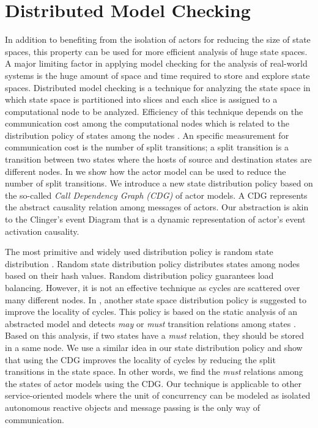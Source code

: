 \section{Distributed Model Checking} \label{sec::DMC}
In addition to benefiting from the isolation of actors for reducing the size of state spaces, this property can be used for more efficient analysis of huge state spaces. A major limiting factor in applying model checking for the analysis of real-world systems is the huge amount of space and time required to store and explore state spaces. Distributed model checking is a technique for analyzing the state space in which state space is partitioned into slices and each slice is assigned to a computational node to be analyzed. Efficiency of this technique depends on the communication cost among the computational nodes which is related to the distribution policy of states among the nodes \cite{DBLP:journals/entcs/OrzanPE05}.
%
An specific measurement for communication cost is the number of split transitions; a split transition is a transition between two states  where the hosts of source and destination states are different nodes. In \cite{DBLP:journals/eceasst/KhamespanahSMSR15} we show how the actor model can be used to reduce the number of split transitions. We introduce a new state distribution policy based on the so-called \textit{Call Dependency Graph (CDG)} of actor models. A CDG represents the abstract causality relation among messages of actors. Our abstraction is akin to the Clinger's event Diagram \cite{clinger} that is a dynamic representation of actor's event activation causality. 

The most primitive and widely used distribution policy is random state distribution \cite{DBLP:journals/entcs/GaravelMS13}. Random state distribution policy distributes states among nodes based on their hash values. Random distribution policy guarantees load balancing. However, it is not an effective technique as cycles are scattered over many different nodes. In \cite{DBLP:journals/entcs/OrzanPE05}, another state space distribution policy is suggested to improve the locality of cycles.  This policy is based on the static analysis of an abstracted model and detects \emph{may} or \emph{must} transition relations among states \cite{DBLP:conf/lics/LarsenT88}.
Based on this analysis, if two states have a \emph{must} relation, they should be stored in a same node. We use a similar idea in our state distribution policy and show that using the CDG improves the locality of cycles by reducing the split transitions in the state space. In other words, we find the \emph{must} relations among the states of actor models using the CDG. Our technique is applicable to other service-oriented
models where the unit of concurrency can be modeled as isolated autonomous reactive objects and message passing is the only way of communication. 

